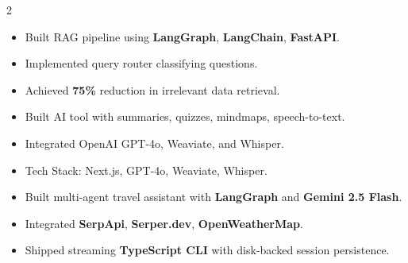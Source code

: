 \documentclass[10pt,a4paper]{altacv}
\begin{document}
\begin{paracol}{2}
\switchcolumn



\vspace{0.1cm}



\vspace{0.1cm}



\vspace{0.1cm}


\begin{itemize}
\item Built RAG pipeline using \textbf{LangGraph}, \textbf{LangChain}, \textbf{FastAPI}.
\item Implemented query router classifying questions.
\item Achieved \textbf{75\%} reduction in irrelevant data retrieval.
\end{itemize}
\divider

\begin{itemize}
\item Built AI tool with summaries, quizzes, mindmaps, speech-to-text.
\item Integrated OpenAI GPT-4o, Weaviate, and Whisper.
\item Tech Stack: Next.js, GPT-4o, Weaviate, Whisper.
\end{itemize}
\divider

\begin{itemize}
\item Built multi-agent travel assistant with \textbf{LangGraph} and \textbf{Gemini 2.5 Flash}.
\item Integrated \textbf{SerpApi}, \textbf{Serper.dev}, \textbf{OpenWeatherMap}.
\item Shipped streaming \textbf{TypeScript CLI} with disk-backed session persistence.
\end{itemize}

\end{paracol}
\end{document}
